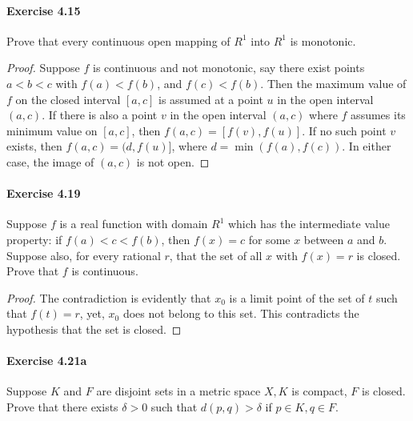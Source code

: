 \documentclass{article}
\theoremstyle{definition}
\begin{document}
\paragraph{Exercise 4.15} Prove that every continuous open mapping of $R^{1}$ into $R^{1}$ is monotonic.
\begin{proof}
    Suppose $f$ is continuous and not monotonic, say there exist points $a<b<c$ with $f(a)<f(b)$, and $f(c)<f(b)$. Then the maximum value of $f$ on the closed interval $[a, c]$ is assumed at a point $u$ in the open interval $(a, c)$. If there is also a point $v$ in the open interval $(a, c)$ where $f$ assumes its minimum value on $[a, c]$, then $f(a, c)=[f(v), f(u)]$. If no such point $v$ exists, then $f(a, c)=(d, f(u)]$, where $d=\min (f(a), f(c))$. In either case, the image of $(a, c)$ is not open.
\end{proof}


\paragraph{Exercise 4.19} Suppose $f$ is a real function with domain $R^{1}$ which has the intermediate value property: if $f(a)<c<f(b)$, then $f(x)=c$ for some $x$ between $a$ and $b$. Suppose also, for every rational $r$, that the set of all $x$ with $f(x)=r$ is closed. Prove that $f$ is continuous.
\begin{proof}
    The contradiction is evidently that $x_0$ is a limit point of the set of $t$ such that $f(t)=r$, yet, $x_0$ does not belong to this set. This contradicts the hypothesis that the set is closed.
\end{proof}


\paragraph{Exercise 4.21a} Suppose $K$ and $F$ are disjoint sets in a metric space $X, K$ is compact, $F$ is closed. Prove that there exists $\delta>0$ such that $d(p, q)>\delta$ if $p \in K, q \in F$.
\end{document}
